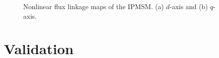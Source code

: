\documentclass[conference]{IEEEtran}
\begin{document}
\begin{figure}
    \centering
    \captionsetup{font=footnotesize}
    \label{fig:subfig3-a}
    \hfill
    \label{fig:subfig3-b}
    \caption{Nonlinear flux linkage maps of the IPMSM. (a) $d$-axis and (b) $q$-axis.}
    \label{Fig3}
\end{figure}

\section{Validation}
\end{document}

